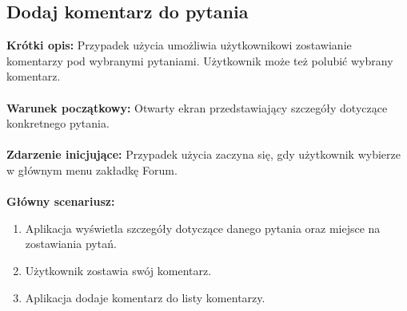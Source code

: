 \documentclass[10pt,a4paper]{report}
\begin{document}
\begin{adjustwidth}{2cm}{2cm}
\subsection{Dodaj komentarz do pytania}
\begin{minipage}{1\linewidth}
\textbf{Krótki opis:} Przypadek użycia umożliwia użytkownikowi zostawianie komentarzy pod wybranymi pytaniami. Użytkownik może też polubić wybrany komentarz.\\ \\
\textbf{Warunek początkowy:} Otwarty ekran przedstawiający szczegóły dotyczące konkretnego pytania.\\ \\
\textbf{Zdarzenie inicjujące:} Przypadek użycia zaczyna się, gdy użytkownik wybierze w głównym menu zakładkę Forum. \\ \\
\textbf{Główny scenariusz:} 
\begin{enumerate}
\setlength\itemsep{0.2cm}
    \item Aplikacja wyświetla szczegóły dotyczące danego pytania oraz miejsce na zostawiania pytań. 
    \item Użytkownik zostawia swój komentarz.
    \item Aplikacja dodaje komentarz do listy komentarzy.
\end{enumerate}
\end{minipage}

\end{adjustwidth}
\end{document}
